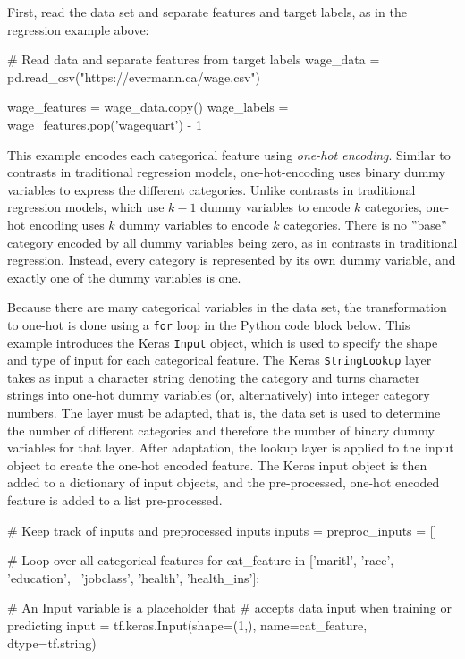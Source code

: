 \begin{withcode}
First, read the data set and separate features and target labels, as in the regression example above:

\begin{pythoncode}
# Read data and separate features from target labels
wage_data = pd.read_csv("https://evermann.ca/wage.csv")
    
wage_features = wage_data.copy()
wage_labels = wage_features.pop('wagequart') - 1
\end{pythoncode}

This example encodes each categorical feature using \emph{one-hot encoding}. Similar to contrasts in traditional regression models, one-hot-encoding uses binary dummy variables to express the different categories. Unlike contrasts in traditional regression models, which use $k-1$ dummy variables to encode $k$ categories, one-hot encoding uses $k$ dummy variables to encode $k$ categories. There is no ''base'' category encoded by all dummy variables being zero, as in contrasts in traditional regression. Instead, every category is represented by its own dummy variable, and exactly one of the dummy variables is one. 

Because there are many categorical variables in the data set, the transformation to one-hot is done using a \texttt{for} loop in the Python code block below. This example introduces the Keras \texttt{Input} object, which is used to specify the shape and type of input for each categorical feature. The Keras \texttt{StringLookup} layer takes as input a character string denoting the category and turns character strings into one-hot dummy variables (or, alternatively) into integer category numbers. The layer must be adapted, that is, the data set is used to determine the number of different categories and therefore the number of binary dummy variables for that layer. After adaptation, the lookup layer is applied to the input object to create the one-hot encoded feature. The Keras input object is then added to a dictionary of input objects, and the pre-processed, one-hot encoded feature is added to a list pre-processed.

\begin{pythoncode}
# Keep track of inputs and preprocessed inputs
inputs = {}
preproc_inputs = []

# Loop over all categorical features
for cat_feature in ['maritl', 'race', 'education', \
                    'jobclass', 'health', 'health_ins']:
               
    # An Input variable is a placeholder that
    # accepts data input when training or predicting
    input = tf.keras.Input(shape=(1,), 
       name=cat_feature, dtype=tf.string)
    

\end{pythoncode}
\end{withcode}
